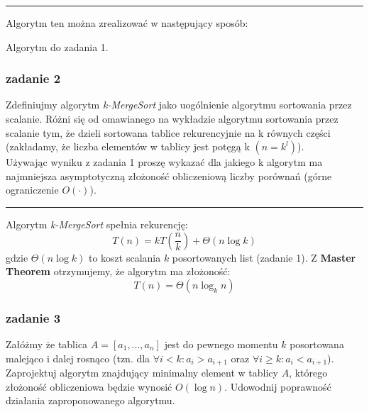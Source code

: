 \documentclass[11pt,a4paper]{article}
\begin{document}
\bigskip
\hrule
\bigskip

Algorytm ten można zrealizować w następujący sposób:
\begin{algorithm}
    \caption{Algorytm do zadania 1.}
    \begin{algorithmic}[1]
        \EndFor
        \EndFor
        \EndProcedure
    \end{algorithmic}
\end{algorithm}

\subsubsection{zadanie 2}
Zdefiniujmy algorytm \textit{k-MergeSort} jako uogólnienie algorytmu sortowania przez scalanie. Różni się od omawianego na wykładzie algorytmu sortowania przez scalanie tym, że dzieli sortowana tablice rekurencyjnie na k równych części (zakładamy, że liczba elementów w tablicy jest potęgą k $(n = k^l)$). \\
Używając wyniku z zadania 1 proszę wykazać dla jakiego k algorytm ma najmniejsza asymptotyczną złożoność obliczeniową liczby porównań (górne ograniczenie $O(\cdot)$).

\bigskip
\hrule
\bigskip

Algorytm \textit{k-MergeSort} spełnia rekurencję:
\[
    T(n) = kT(\frac{n}{k}) + \Theta(n \log k)
\]
gdzie $\Theta(n \log k)$ to koszt scalania $k$ posortowanych list (zadanie 1). Z \textbf{Master Theorem} otrzymujemy, że algorytm ma złożoność:
\[
    T(n) = \Theta(n \log_k n)
\]

\subsubsection{zadanie 3}
Załóżmy że tablica $A = [a_1, \dots, a_n]$ jest do pewnego momentu $k$ posortowana malejąco i dalej rosnąco (tzn. dla $\forall i < k: a_i > a_{i+1}$ oraz $\forall i \geq k: a_i < a_{i+1}$). Zaprojektuj algorytm znajdujący minimalny element w tablicy $A$, którego złożoność obliczeniowa będzie wynosić $O(\log n)$. Udowodnij poprawność działania zaproponowanego algorytmu.
\end{document}
